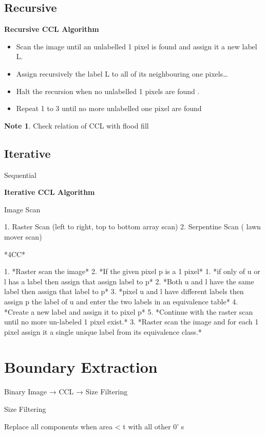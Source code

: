 \documentclass[11pt]{article}
\theoremstyle{definition}
\newtheorem*{unnote}{Note}  %
\begin{document}
\subsection{Recursive}
\textbf{Recursive CCL Algorithm}
\begin{itemize}
\item Scan the image until an unlabelled 1 pixel is found and assign it a new label L.
\item Assign recursively the label L to all of its neighbouring one pixels…
\item Halt the recursion when no unlabelled 1 pixels are found .
\item Repeat 1 to 3 until no more unlabelled one pixel are found 
\end{itemize}


\begin{unnote}
    Check relation of CCL with flood fill
\end{unnote} 
\subsection{Iterative}

Sequential

\textbf{Iterative CCL Algorithm}

Image Scan

1. Raster Scan (left to right, top to bottom array scan)
2. Serpentine Scan ( lawn mover scan)

*4CC*

1. *Raster scan the image*
2. *If the given pixel p is a 1 pixel*
    1. *if only of u or l has a label then assign that assign label to p*
    2. *Both u and l have the same label then assign that label to p*
    3. *pixel u and l have different labels then assign p the label of u and enter the two labels in an equivalence table*
    4. *Create a new label and assign it to pixel p*
    5. *Continue with the raster scan until no more un-labeled 1 pixel exist.* 
3. *Raster scan the image and for each 1 pixel assign it a single unique label from its equivalence class.*

\newpage
\section{Boundary Extraction}
Binary Image → CCL → Size Filtering

Size Filtering

Replace all components when area < t  with all other 0’ s 
\end{document}
